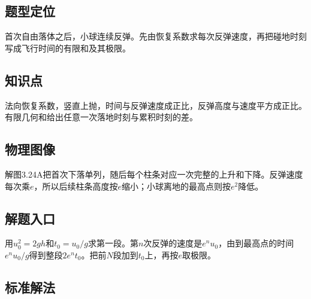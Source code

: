 \documentclass[UTF8,fontset=fandol,a4paper,11pt]{ctexart}
\begin{document}


\subsection*{题型定位}

首次自由落体之后，小球连续反弹。先由恢复系数求每次反弹速度，再把碰地时刻写成飞行时间的有限和及其极限。



\subsection*{知识点}

法向恢复系数，竖直上抛，时间与反弹速度成正比，反弹高度与速度平方成正比。有限几何和给出任意一次落地时刻与累积时刻的差。




\subsection*{物理图像}

解图3.24A把首次下落单列，随后每个柱条对应一次完整的上升和下降。反弹速度每次乘$e$，所以后续柱条高度按$e$缩小；小球离地的最高点则按$e^2$降低。



\subsection*{解题入口}

用$u_0^2=2gh$和$t_0=u_0/g$求第一段。第$n$次反弹的速度是$e^nu_0$，由到最高点的时间$e^nu_0/g$得到整段$2e^nt_0$。把前$N$段加到$t_0$上，再按$e$取极限。



\subsection*{标准解法}
\end{document}
